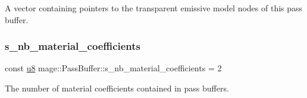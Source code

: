 A vector containing pointers to the transparent emissive model nodes of this pass buffer. \hypertarget{structmage_1_1_pass_buffer_a453e18abdf29c4ebb08d9e002a952bf2}{}\label{structmage_1_1_pass_buffer_a453e18abdf29c4ebb08d9e002a952bf2} 
\subsubsection{\texorpdfstring{s\+\_\+nb\+\_\+material\+\_\+coefficients}{s\_nb\_material\_coefficients}}
{\footnotesize\ttfamily const \hyperlink{namespacemage_a5a362e2d56fc439362a80516ecae7828}{u8} mage\+::\+Pass\+Buffer\+::s\+\_\+nb\+\_\+material\+\_\+coefficients = 2\hspace{0.3cm}{\ttfamily [static]}}

The number of material coefficients contained in pass buffers. 